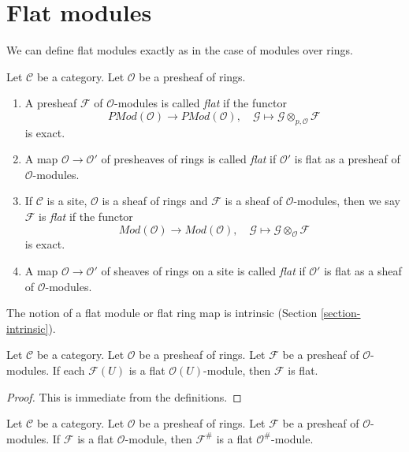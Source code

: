 \section{Flat modules}
\label{section-flat}

\noindent
We can define flat modules exactly as in the case of modules over rings.

\begin{definition}
\label{definition-flat}
Let $\mathcal{C}$ be a category.
Let $\mathcal{O}$ be a presheaf of rings.
\begin{enumerate}
\item A presheaf $\mathcal{F}$ of $\mathcal{O}$-modules is called
{\it flat} if the functor
$$
\textit{PMod}(\mathcal{O})
\longrightarrow
\textit{PMod}(\mathcal{O}), \quad
\mathcal{G} \mapsto \mathcal{G} \otimes_{p, \mathcal{O}} \mathcal{F}
$$
is exact.
\item A map $\mathcal{O} \to \mathcal{O}'$ of presheaves of rings
is called {\it flat} if $\mathcal{O}'$ is flat as a presheaf of
$\mathcal{O}$-modules.
\item If $\mathcal{C}$ is a site, $\mathcal{O}$ is a sheaf of rings
and $\mathcal{F}$ is a sheaf of $\mathcal{O}$-modules, then we
say $\mathcal{F}$ is {\it flat} if the functor
$$
\textit{Mod}(\mathcal{O})
\longrightarrow
\textit{Mod}(\mathcal{O}), \quad
\mathcal{G} \mapsto \mathcal{G} \otimes_\mathcal{O} \mathcal{F}
$$
is exact.
\item A map $\mathcal{O} \to \mathcal{O}'$ of sheaves of rings on a site
is called {\it flat} if $\mathcal{O}'$ is flat as a sheaf of
$\mathcal{O}$-modules.
\end{enumerate}
\end{definition}

\noindent
The notion of a flat module or flat ring map is intrinsic
(Section \ref{section-intrinsic}).

\begin{lemma}
\label{lemma-flatness-presheaves}
Let $\mathcal{C}$ be a category.
Let $\mathcal{O}$ be a presheaf of rings.
Let $\mathcal{F}$ be a presheaf of $\mathcal{O}$-modules.
If each $\mathcal{F}(U)$ is a flat $\mathcal{O}(U)$-module,
then $\mathcal{F}$ is flat.
\end{lemma}

\begin{proof}
This is immediate from the definitions.
\end{proof}

\begin{lemma}
\label{lemma-flatness-sheafification}
Let $\mathcal{C}$ be a category.
Let $\mathcal{O}$ be a presheaf of rings.
Let $\mathcal{F}$ be a presheaf of $\mathcal{O}$-modules.
If $\mathcal{F}$ is a flat $\mathcal{O}$-module, then
$\mathcal{F}^\#$ is a flat $\mathcal{O}^\#$-module.
\end{lemma}

